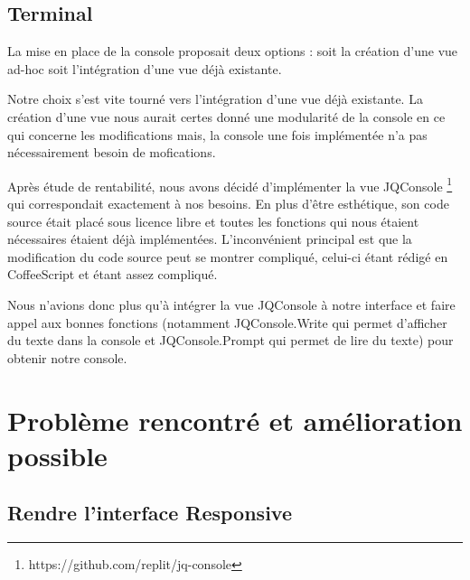 \subsection{Terminal}

\par La mise en place de la console proposait deux options : soit la création d'une vue ad-hoc soit l'intégration d'une vue déjà existante.

\par Notre choix s'est vite tourné vers l'intégration d'une vue déjà existante. La création d'une vue nous aurait certes donné une modularité de la console en ce qui concerne les modifications mais, la console une fois implémentée n'a pas nécessairement besoin de mofications.

\par Après étude de rentabilité, nous avons décidé d'implémenter la vue JQConsole \footnote{https://github.com/replit/jq-console} qui correspondait exactement à nos besoins. En plus d'être esthétique, son code source était placé sous licence libre et toutes les fonctions qui nous étaient nécessaires étaient déjà implémentées. L'inconvénient principal est que la modification du code source peut se montrer compliqué, celui-ci étant rédigé en CoffeeScript et étant assez compliqué.

\par Nous n'avions donc plus qu'à intégrer la vue JQConsole à notre interface et faire appel aux bonnes fonctions (notamment JQConsole.Write qui permet d'afficher du texte dans la console et JQConsole.Prompt qui permet de lire du texte) pour obtenir notre console.

\section{Problème rencontré et amélioration possible}

\subsection{Rendre l'interface Responsive}
